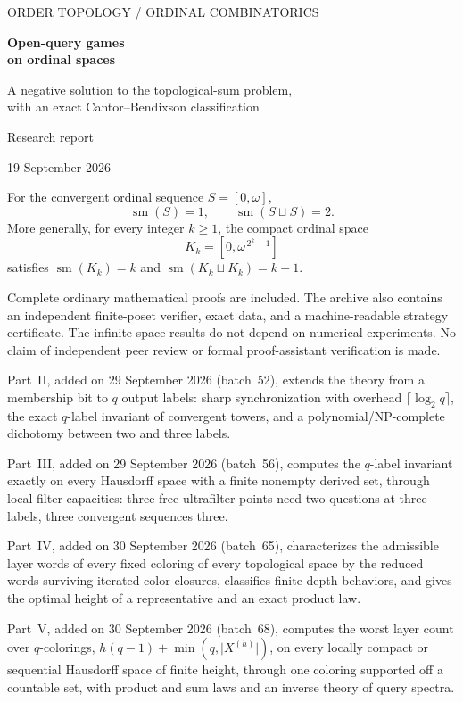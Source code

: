 \documentclass[11pt,letterpaper]{article}
\numberwithin{equation}{section}
\theoremstyle{definition}
\theoremstyle{remark}
\theoremstyle{definition}
\newcommand{\sm}{\operatorname{sm}}
\begin{document}
\hypersetup{pageanchor=false}
\begin{titlepage}
\vspace*{0.1in}
{\sffamily\color{Teal}\large ORDER TOPOLOGY \; / \; ORDINAL COMBINATORICS\par}
\vspace{0.35in}
{\sffamily\bfseries\color{Navy}\Huge Open-query games\\[0.15em] on ordinal spaces\par}
\vspace{0.3in}
{\sffamily\color{Navy}\Large A negative solution to the topological-sum problem,\\
with an exact Cantor--Bendixson classification\par}
\vspace{0.35in}
{\large Research report\par}
{\color{Gray}19 September 2026\par}
\vspace{0.3in}
\begin{resultbox}
For the convergent ordinal sequence $S=[0,\omega]$,
\[
 \sm(S)=1,
 \qquad
 \sm(S\sqcup S)=2.
\]
More generally, for every integer $k\geq1$, the compact ordinal space
\[
 K_k=[0,\omega^{\,2^k-1}]
\]
satisfies $\sm(K_k)=k$ and $\sm(K_k\sqcup K_k)=k+1$.
\end{resultbox}
\vfill
{\small\color{Gray}
Complete ordinary mathematical proofs are included. The archive also contains
an independent finite-poset verifier, exact data, and a machine-readable strategy
certificate. The infinite-space results do not depend on numerical experiments.
No claim of independent peer review or formal proof-assistant verification is made.\par
\smallskip
Part~II, added on 29 September 2026 (batch~52), extends the theory from a
membership bit to $q$ output labels: sharp synchronization with overhead
$\lceil\log_2q\rceil$, the exact $q$-label invariant of convergent towers, and
a polynomial/NP-complete dichotomy between two and three labels.\par
\smallskip
Part~III, added on 29 September 2026 (batch~56), computes the $q$-label
invariant exactly on every Hausdorff space with a finite nonempty derived set,
through local filter capacities: three free-ultrafilter points need two
questions at three labels, three convergent sequences three.\par
\smallskip
Part~IV, added on 30 September 2026 (batch~65), characterizes the admissible
layer words of every fixed coloring of every topological space by the reduced
words surviving iterated color closures, classifies finite-depth behaviors,
and gives the optimal height of a representative and an exact product law.\par
\smallskip
Part~V, added on 30 September 2026 (batch~68), computes the worst layer
count over $q$-colorings, $h(q-1)+\min(q,\lvert X^{(h)}\rvert)$, on every
locally compact or sequential Hausdorff space of finite height, through one
coloring supported off a countable set, with product and sum laws and an
inverse theory of query spectra.\par}
\end{titlepage}
\hypersetup{pageanchor=true}
\end{document}
